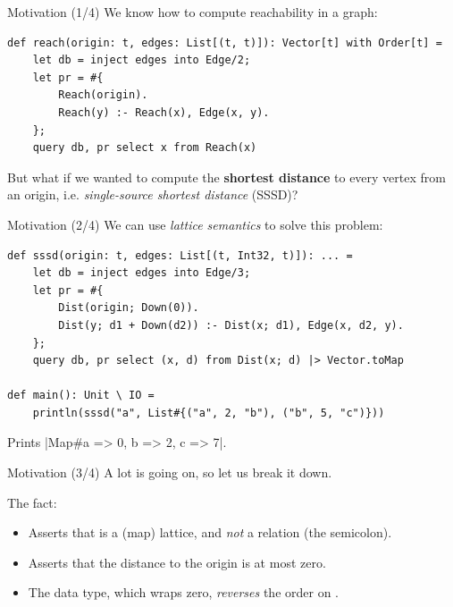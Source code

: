 \begin{frame}[fragile]{Motivation (1/4)}
We know how to compute reachability in a graph:

\begin{lstlisting}[language=flix, xleftmargin=0.8cm]
def reach(origin: t, edges: List[(t, t)]): Vector[t] with Order[t] = 
    let db = inject edges into Edge/2;
    let pr = #{
        Reach(origin).
        Reach(y) :- Reach(x), Edge(x, y).
    };
    query db, pr select x from Reach(x)
\end{lstlisting}

\pause

But what if we wanted to compute the \textbf{shortest distance} to every vertex
from an origin, i.e. \emph{single-source shortest distance} (SSSD)?
\end{frame}

\begin{frame}[fragile]{Motivation (2/4)}
We can use \emph{lattice semantics} to solve this problem:

\begin{lstlisting}[language=flix, xleftmargin=0.8cm]
def sssd(origin: t, edges: List[(t, Int32, t)]): ... = 
    let db = inject edges into Edge/3;
    let pr = #{
        Dist(origin; Down(0)).
        Dist(y; d1 + Down(d2)) :- Dist(x; d1), Edge(x, d2, y).
    };
    query db, pr select (x, d) from Dist(x; d) |> Vector.toMap

def main(): Unit \ IO = 
    println(sssd("a", List#{("a", 2, "b"), ("b", 5, "c")}))
\end{lstlisting}

Prints \Code|Map#{a => 0, b => 2, c => 7}|.
\end{frame}

\begin{frame}[fragile]{Motivation (3/4)}
A lot is going on, so let us break it down.

\medskip

The fact: 

\begin{itemize}
    \pause \item Asserts that  is a (map) lattice, and \emph{not} a relation (the semicolon).
    \pause \item Asserts that the distance to the origin is at most zero. 
    \pause \item The  data type, which wraps zero, \emph{reverses} the order
    on .
\end{itemize}
\end{frame}

